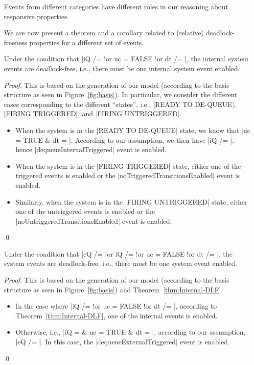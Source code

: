 Events from different categories have different roles in our reasoning
about responsive properties.

We are now present a theorem and a corollary related to (relative)
deadlock-freeness properties for a different set of events.
\begin{theorem}
  \label{thm:Internal-DLF}
  Under the condition that %
  |iQ /= {} !or uc = FALSE !or dt /= {}|, %
  the internal system events are deadlock-free, i.e., there must be
  one internal system event enabled.
\end{theorem}
\begin{proof}
  This is based on the generation of our \EventB model (according to
  the basis structure as seen in Figure~\ref{fig:basis}).  In
  particular, we consider the different cases corresponding to the
  different ``states'', i.e., |READY TO DE-QUEUE|, |FIRING TRIGGERED|,
  and |FIRING UNTRIGGERED|.
  \begin{itemize}
  \item When the system is in the |READY TO DE-QUEUE| state, we know
    that %
    |uc = TRUE & dt = {}|.  %
    According to our assumption, we then have |iQ /= {}|, hence
    |dequeueInternalTriggered| event is enabled.
    
  \item When the system is in the |FIRING TRIGGERED| state,
    either one of the triggered events is enabled or the
    |noTriggeredTransitionsEnabled| event is enabled.
    
  \item Similarly, when the system is in the |FIRING UNTRIGGERED|
    state, either one of the untriggered events is enabled or the
    |noUntriggeredTransitionsEnabled| event is enabled.  
  \end{itemize}
  \qed
\end{proof}
    
\begin{corollary}
  Under the condition that %
  |eQ /= {} !or iQ /= {} !or uc = FALSE !or dt /= {}|, %
  the system events are deadlock-free, i.e., there must be
  one system event enabled.
\end{corollary}
\begin{proof}
  This is based on the generation of our \EventB model (according to
  the basis structure as seen in Figure~\ref{fig:basis}) and
  Theorem~\ref{thm:Internal-DLF}.
  \begin{itemize}
  \item In the case where |iQ /= {} !or uc = FALSE !or dt /= {}|,
    according to Theorem~\ref{thm:Internal-DLF}, one of the internal
    events is enabled.
    
  \item Otherwise, i.e., |iQ = {} & uc = TRUE & dt = {}|, according to
    our assumption, |eQ /= {}|. In this case, the
    |dequeueExternalTriggered| event is enabled.
  \end{itemize}
  \qed
\end{proof}

